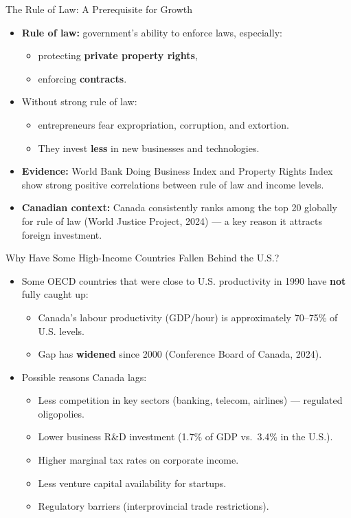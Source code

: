 \documentclass[aspectratio=169]{beamer}
\begin{document}
\begin{frame}{The Rule of Law: A Prerequisite for Growth}
\transfade
\begin{itemize}
  \item \textbf{Rule of law:} government's ability to enforce laws, especially:
  \begin{itemize}
    \item protecting \textbf{private property rights},
    \item enforcing \textbf{contracts}.
  \end{itemize}
  \item Without strong rule of law:
  \begin{itemize}
    \item entrepreneurs fear expropriation, corruption, and extortion.
    \item They invest \textbf{less} in new businesses and technologies.
  \end{itemize}
  \item \textbf{Evidence:} World Bank Doing Business Index and Property Rights Index show strong positive correlations between rule of law and income levels.
  \item \textbf{Canadian context:} Canada consistently ranks among the top 20 globally for rule of law (World Justice Project, 2024) --- a key reason it attracts foreign investment.
\end{itemize}
\end{frame}

\begin{frame}{Why Have Some High-Income Countries Fallen Behind the U.S.?}
\transfade
\begin{itemize}
  \item Some OECD countries that were close to U.S. productivity in 1990 have \textbf{not} fully caught up:
  \begin{itemize}
    \item Canada's labour productivity (GDP/hour) is approximately \alert{70--75\%} of U.S. levels.
    \item Gap has \textbf{widened} since 2000 (Conference Board of Canada, 2024).
  \end{itemize}
  \item Possible reasons Canada lags:
  \begin{itemize}
    \item Less competition in key sectors (banking, telecom, airlines) --- regulated oligopolies.
    \item Lower business R\&D investment (1.7\% of GDP vs.\ 3.4\% in the U.S.).
    \item Higher marginal tax rates on corporate income.
    \item Less venture capital availability for startups.
    \item Regulatory barriers (interprovincial trade restrictions).
  \end{itemize}
\end{itemize}
\end{frame}
\end{document}
